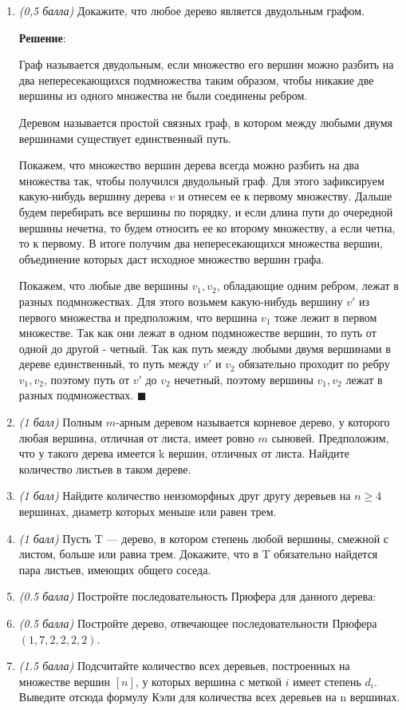 \documentclass{article}
\begin{document}
\begin{enumerate}
    \item \textit{(0,5 балла)} Докажите, что любое дерево является двудольным графом.
    
    \textbf{Решение}:

    Граф называется двудольным, если множество его вершин можно разбить на два непересекающихся подмножества таким образом, чтобы никакие две вершины из одного множества не были соединены ребром.

    Деревом называется простой связных граф, в котором между любыми двумя вершинами существует единственный путь.

    Покажем, что множество вершин дерева всегда можно разбить на два множества так, чтобы получился двудольный граф. Для этого зафиксируем какую-нибудь вершину дерева $v$ и отнесем ее к первому множеству. Дальше будем перебирать все вершины по порядку, и если длина пути до очередной вершины нечетна, то будем относить ее ко второму множеству, а если четна, то к первому. В итоге получим два непересекающихся множества вершин, объединение которых даст исходное множество вершин графа.

    Покажем, что любые две вершины $v_1, v_2$, обладающие одним ребром, лежат в разных подмножествах. Для этого возьмем какую-нибудь вершину $v'$ из первого множества и предположим, что вершина $v_1$ тоже лежит в первом множестве. Так как они лежат в одном подмножестве вершин, то путь от одной до другой - четный. Так как путь между любыми двумя вершинами в дереве единственный, то путь между $v'$ и $v_2$ обязательно проходит по ребру $v_1, v_2$, поэтому путь от $v'$ до $v_2$ нечетный, поэтому вершины $v_1, v_2$ лежат в разных подмножествах. $\blacksquare$

    \item \textit{(1 балл)} Полным $m$-арным деревом называется корневое дерево, у которого любая вершина, отличная от листа, имеет ровно $m$ сыновей. Предположим, что у такого дерева имеется k вершин, отличных от листа. Найдите количество листьев в таком дереве.
    \item \textit{(1 балл)} Найдите количество неизоморфных друг другу деревьев на $n \geq 4$ вершинах, диаметр которых меньше или равен трем.
    \item \textit{(1 балл)} Пусть T — дерево, в котором степень любой вершины, смежной с листом, больше или равна трем. Докажите, что в T обязательно найдется пара листьев, имеющих общего соседа.
    \item \textit{(0.5 балла)} Постройте последовательность Прюфера для данного дерева:
    \item \textit{(0.5 балла)} Постройте дерево, отвечающее последовательности Прюфера $(1, 7, 2, 2, 2, 2)$.
    \item \textit{(1.5 балла)} Подсчитайте количество всех деревьев, построенных на множестве вершин $[n]$, у которых вершина с меткой $i$ имеет степень $d_i$. Выведите отсюда формулу Кэли для количества всех деревьев на n вершинах.
\end{enumerate}
\end{document}

